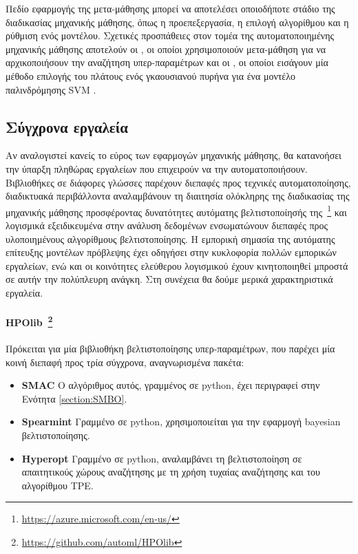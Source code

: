  Πεδίο εφαρμογής της μετα-μάθησης μπορεί να αποτελέσει οποιοδήποτε στάδιο της διαδικασίας μηχανικής μάθησης, όπως η προεπεξεργασία, η επιλογή αλγορίθμου και η ρύθμιση ενός μοντέλου. Σχετικές προσπάθειες στον τομέα της αυτοματοποιημένης μηχανικής μάθησης αποτελούν οι \citet{AAAI1510029}, οι οποίοι χρησιμοποιούν μετα-μάθηση για να αρχικοποιήσουν την αναζήτηση υπερ-παραμέτρων και οι \citet{Soares2004}, οι οποίοι εισάγουν μία μέθοδο επιλογής του πλάτους ενός γκαουσιανού πυρήνα για ένα μοντέλο παλινδρόμησης \gls{SVM} .   
 
 \subsection{Σύγχρονα εργαλεία} \label{section:tools}
 Αν αναλογιστεί κανείς το εύρος των εφαρμογών μηχανικής μάθησης, θα κατανοήσει την ύπαρξη πληθώρας εργαλείων που επιχειρούν να την αυτοματοποιήσουν. Βιβλιοθήκες σε διάφορες γλώσσες παρέχουν διεπαφές προς τεχνικές αυτοματοποίησης, διαδικτυακά περιβάλλοντα αναλαμβάνουν τη διαιτησία ολόκληρης της διαδικασίας της μηχανικής μάθησης προσφέροντας δυνατότητες αυτόματης βελτιστοποίησής της~\footnote{\url{https://azure.microsoft.com/en-us/}} και λογισμικά εξειδικευμένα στην ανάλυση δεδομένων ενσωματώνουν διεπαφές προς υλοποιημένους αλγορίθμους βελτιστοποίησης. Η εμπορική σημασία της αυτόματης επίτευξης μοντέλων πρόβλεψης έχει οδηγήσει στην κυκλοφορία πολλών εμπορικών εργαλείων, ενώ και οι κοινότητες ελεύθερου λογισμικού έχουν κινητοποιηθεί μπροστά σε αυτήν την πολύπλευρη ανάγκη. Στη συνέχεια θα δούμε μερικά χαρακτηριστικά εργαλεία.
 \paragraph[HPOlib]{HPOlib~\footnote{\url{https://github.com/automl/HPOlib}} }  Πρόκειται για μία βιβλιοθήκη βελτιστοποίησης υπερ-παραμέτρων, που παρέχει μία κοινή διεπαφή προς τρία σύγχρονα, αναγνωρισμένα πακέτα: 
 \begin{itemize}
 	\item \textbf{SMAC} Ο αλγόριθμος αυτός, γραμμένος σε python, έχει περιγραφεί στην Ενότητα \ref{section:SMBO}.
 	\item \textbf{Spearmint} Γραμμένο σε python, χρησιμοποιείται για την εφαρμογή bayesian βελτιστοποίησης.
 	\item \textbf{Hyperopt} Γραμμένο σε python, αναλαμβάνει τη βελτιστοποίηση σε απαιτητικούς χώρους αναζήτησης με τη χρήση τυχαίας αναζήτησης και του αλγορίθμου TPE.
 \end{itemize}
 
